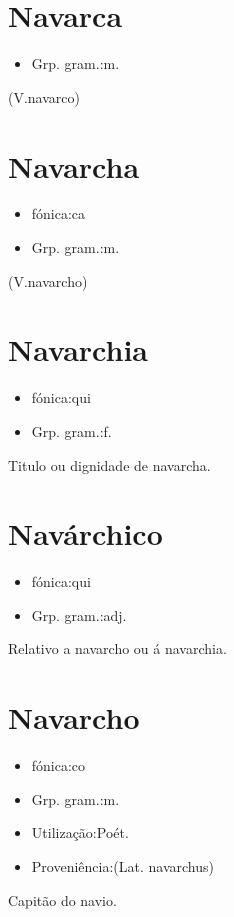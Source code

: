 \section{Navarca}
\begin{itemize}
\item {Grp. gram.:m.}
\end{itemize}
(V.navarco)
\section{Navarcha}
\begin{itemize}
\item {fónica:ca}
\end{itemize}
\begin{itemize}
\item {Grp. gram.:m.}
\end{itemize}
(V.navarcho)
\section{Navarchia}
\begin{itemize}
\item {fónica:qui}
\end{itemize}
\begin{itemize}
\item {Grp. gram.:f.}
\end{itemize}
Titulo ou dignidade de navarcha.
\section{Navárchico}
\begin{itemize}
\item {fónica:qui}
\end{itemize}
\begin{itemize}
\item {Grp. gram.:adj.}
\end{itemize}
Relativo a navarcho ou á navarchia.
\section{Navarcho}
\begin{itemize}
\item {fónica:co}
\end{itemize}
\begin{itemize}
\item {Grp. gram.:m.}
\end{itemize}
\begin{itemize}
\item {Utilização:Poét.}
\end{itemize}
\begin{itemize}
\item {Proveniência:(Lat. \textunderscore navarchus\textunderscore )}
\end{itemize}
Capitão do navio.
